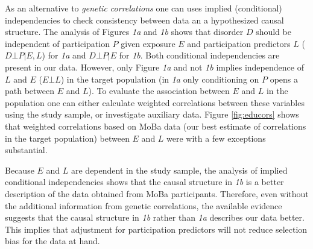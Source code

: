 \documentclass[12pt]{article}
\begin{document}
As an alternative to \emph{genetic correlations} one can uses implied (conditional) independencies to check consistency between data an a hypothesized causal structure. The analysis of Figures \emph{1a} and \emph{1b} shows that disorder $D$ should be independent of participation $P$ given exposure $E$ and participation predictors $L$ ($D \bot P|E,L$) for \emph{1a} and $D \bot P | E$ for \emph{1b}. Both conditional independencies are present in our data. However, only Figure \emph{1a} and not \emph{1b} implies independence of $L$ and $E$ ($E \bot L$) in the target population (in \emph{1a} only conditioning on $P$ opens a path between $E$ and $L$). To evaluate the association between $E$ and $L$ in the population one can either calculate weighted correlations between these variables using the study sample, or investigate auxiliary data. Figure \ref{fig:educors} shows that weighted correlations based on MoBa data (our best estimate of correlations in the target population) between $E$ and $L$ were with a few exceptions substantial. 

Because $E$ and $L$ are dependent in the study sample, the analysis of implied conditional independencies shows that the causal structure in \emph{1b} is a better description of the data obtained from MoBa participants. Therefore, even without the additional information from genetic correlations, the available evidence suggests that the causal structure in \emph{1b} rather than \emph{1a} describes our data better. This implies that adjustment for participation predictors will not reduce selection bias for the data at hand.



	


\printbibliography
\end{document}
